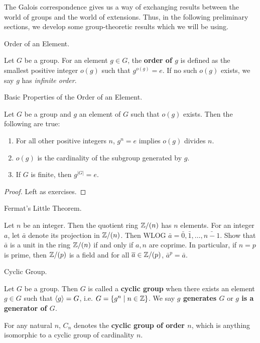 \documentclass[../../book.tex]{subfiles}
\begin{document}
The Galois correspondence gives us a way of exchanging results
between the world of groups and the world of extensions. 
Thus, in the following preliminary sections, 
we develop some group-theoretic results which we will be using. 

\begin{dfn} Order of an Element.
    
    Let $G$ be a group. 
    For an element $g \in G$, the \textbf{order of $g$} is defined as 
    the smallest positive integer $o(g)$ such that $g^{o(g)} = e$. 
    If no such $o(g)$ exists, we say $g$ has \emph{infinite order}. 

\end{dfn}
    
\begin{thm} Basic Properties of the Order of an Element.
    
    Let $G$ be a group and $g$ an element of $G$ such that $o(g)$ exists.
    Then the following are true: \begin{enumerate}
        \item For all other positive integers $n$, 
        $g^n = e$ implies $o(g)$ divides $n$.
        \item $o(g)$ is the cardinality of the subgroup generated by $g$.
        \item If $G$ is finite, then $g^{|G|} = e$.
    \end{enumerate}
\end{thm}
\begin{proof}
    Left as exercises. 
\end{proof}

\begin{ex} Fermat's Little Theorem.
    
    Let $n$ be an integer. 
    Then the quotient ring $\mathbb{Z} / (n)$ has $n$ elements.
    For an integer $a$, let $\bar{a}$ denote its projection in $\mathbb{Z} / (n)$.
    Then WLOG $\bar{a} = \bar{0}, \bar{1}, \dots, \bar{n-1}$. 
    Show that $\bar{a}$ is a unit in the ring $\mathbb{Z} / (n)$
    if and only if $a, n$ are coprime. 
    In particular, if $n = p$ is prime, then $\mathbb{Z} / (p)$ is a field
    and for all $\overline{a} \in \mathbb{Z}/(p)$, $\bar{a}^p = \bar{a}$. 
    
\end{ex}
    
\begin{dfn} Cyclic Group.
    
    Let $G$ be a group. 
    Then $G$ is called a \textbf{cyclic group} when 
    there exists an element $g \in G$ such that $\langle g\rangle = G$,
    i.e. $G = \{ g^n \mid n \in \mathbb{Z}\}$.
    We say \textbf{$g$ generates $G$} or \textbf{$g$ is a generator of $G$}.
    
    For any natural $n$, $C_n$ denotes the \textbf{cyclic group of order $n$},
    which is anything isomorphic to a cyclic group of cardinality $n$. 
\end{dfn}
\end{document}
